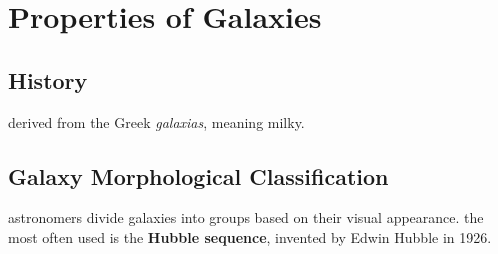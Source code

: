 \section{Properties of Galaxies}
\subsection{History}
derived from the Greek \emph{galaxias}, meaning milky.
\subsection{Galaxy Morphological Classification}
astronomers divide galaxies into groups based on their visual appearance. the most often used is the \textbf{Hubble sequence}, invented by Edwin Hubble in 1926. 

		

		
